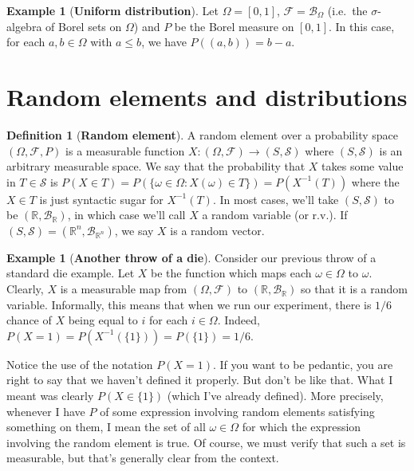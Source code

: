 \documentclass{article}
\theoremstyle{definition}
\newtheorem{definition}[theorem]{Definition}
\newtheorem{example}[theorem]{Example}
\begin{document}
\begin{example}[\textbf{Uniform distribution}]
    Let $\Omega = [0, 1]$, $\mathcal{F} = \mathcal{B}_{\Omega}$ (i.e.\ the $\sigma$-algebra
    of Borel sets on $\Omega$) and $P$ be the Borel measure on $[0, 1]$. In this case, for each $a, b \in \Omega$ with $a \leq b$,
    we have $P((a, b)) = b - a$.
\end{example}

\section{Random elements and distributions}

\begin{definition}[\textbf{Random element}]
    A random element over a probability space $(\Omega, \mathcal{F}, P)$ is a measurable function $X : (\Omega, \mathcal{F}) \to (S, \mathcal{S})$ where $(S, \mathcal{S})$ is an arbitrary measurable space. We say that the probability that $X$ takes some value in $T \in \mathcal{S}$ is $P(X \in T) = P(\{\omega \in \Omega : X(\omega) \in T \}) = P(X^{-1}(T))$ where
    the $X \in T$ is just syntactic sugar for $X^{-1}(T)$. In most cases, we'll take $(S, \mathcal{S})$ to be $(\mathbb{R}, \mathcal{B}_{\mathbb{R}})$, in which case we'll call $X$ a random variable (or r.v.). If $(S, \mathcal{S}) = (\mathbb{R}^n, \mathcal{B}_{\mathbb{R}^n})$, we say $X$ is a random vector.
\end{definition}

\begin{example}[\textbf{Another throw of a die}]
    Consider our previous throw of a standard die example. Let $X$ be the function which maps each $\omega \in \Omega$ to $\omega$. Clearly, $X$ is a measurable map from $(\Omega, \mathcal{F})$ to $(\mathbb{R}, \mathcal{B}_{\mathbb{R}})$ so that it is a random variable. Informally, this means that when we run our experiment, there is $1/6$ chance of $X$
    being equal to $i$ for each $i \in \Omega$. Indeed, $P(X=1) = P(X^{-1}(\{1\})) = P(\{1 \}) = 1/6$.
\end{example}

Notice the use of the notation $P(X=1)$. If you want to be pedantic, you are right to say that we haven't defined it properly.
But don't be like that. What I meant was clearly $P(X \in \{1\})$ (which I've already defined). More precisely, whenever I have $P$ of some expression involving random elements satisfying something on them, I mean the set of all $\omega \in \Omega$ for which the
expression involving the random element is true. Of course, we must verify that such a set is measurable, but that's generally clear from the context.
\end{document}
